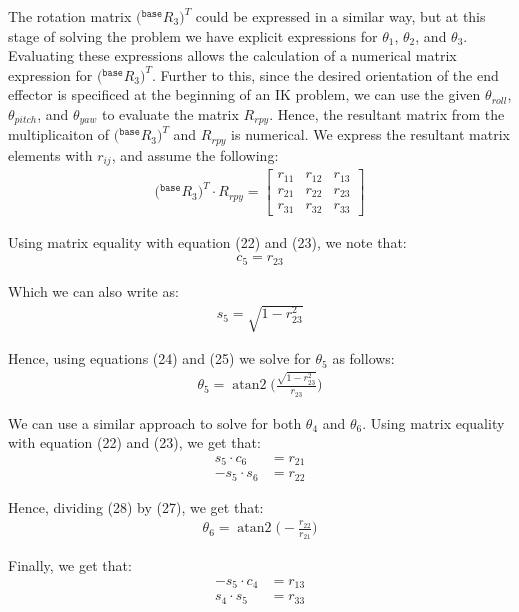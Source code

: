 \documentclass[a4paper]{article}
\DeclareMathOperator{\atantwo}{atan2}
\begin{document}
The rotation matrix $\big({}^{\texttt{base}}R_3\big)^{T}$ could be expressed in a similar way, but at this stage of solving the problem we have explicit expressions for $\theta_1$, $\theta_2$, and $\theta_3$. Evaluating these expressions allows the calculation of a numerical matrix expression for $\big({}^{\texttt{base}}R_3\big)^{T}$. Further to this, since the desired orientation of the end effector is specificed at the beginning of an IK problem, we can use the given $\theta_{roll}$, $\theta_{pitch}$, and $\theta_{yaw}$ to evaluate the matrix $R_{rpy}$. Hence, the resultant matrix from the multiplicaiton of $\big({}^{\texttt{base}}R_3\big)^{T}$ and $R_{rpy}$ is numerical. We express the resultant matrix elements with $r_{ij}$, and assume the following:
\begin{align}
\big({}^{\texttt{base}}R_3\big)^{T} \cdot R_{rpy} =
\begin{bmatrix}
r_{11} & r_{12} & r_{13}\\
r_{21} & r_{22} & r_{23}\\
r_{31} & r_{32} & r_{33}
\end{bmatrix}
\end{align}

Using matrix equality with equation (22) and (23), we note that:
\begin{align}
c_5 = r_{23}
\end{align}

Which we can also write as:
\begin{align}
s_5 = \sqrt{1 - r_{23}^2}
\end{align}

Hence, using equations (24) and (25) we solve for $\theta_5$ as follows:
\begin{align}
\theta_5 = \atantwo \bigg(\frac{\sqrt{1 - r_{23}^2}}{r_{23}}\bigg)
\end{align}

We can use a similar approach to solve for both $\theta_4$ and $\theta_6$. Using matrix equality with equation (22) and (23), we get that:
\begin{align}
s_5 \cdot c_6 &= r_{21}\\ -s_5 \cdot s_6 &= r_{22}
\end{align}

Hence, dividing (28) by (27), we get that:
\begin{align}
\theta_6 = \atantwo \bigg(-\frac{r_{22}}{r_{21}}\bigg)
\end{align}

Finally, we get that:
\begin{align}
-s_5 \cdot c_4 &= r_{13}\\
s_4 \cdot s_5 &= r_{33}
\end{align}
\end{document}
